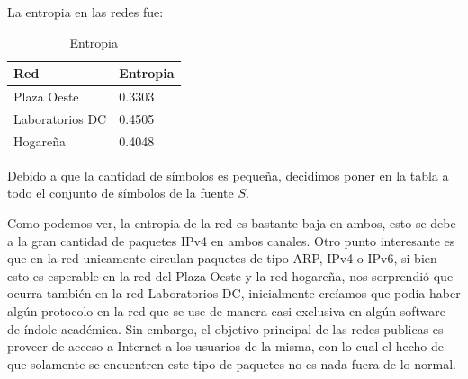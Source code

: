 %
%
%

\pagebreak

La entropia en las redes fue:

\begin{table}[H]
\centering
\caption{Entropia}
\label{my-label}
\begin{tabular}{ll}
\hline
Red         & Entropia \\ \hline
Plaza Oeste & 0.3303   \\
Laboratorios DC    & 0.4505   \\ 
Hogareña & 0.4048   \\  \hline
\end{tabular}
\end{table}

Debido a que la cantidad de símbolos es pequeña, decidimos poner en la tabla a todo el conjunto de símbolos de la fuente $S$.

Como podemos ver, la entropia de la red es bastante baja en ambos, esto se debe a la gran cantidad de paquetes IPv4 en ambos canales. Otro punto interesante es que en la red unicamente circulan paquetes de tipo ARP, IPv4 o IPv6, si bien esto es esperable en la red del Plaza Oeste y la red hogareña, nos sorprendió que ocurra también en la red Laboratorios DC, inicialmente creíamos que podía haber algún protocolo en la red que se use de manera casi exclusiva en algún software de índole académica. Sin embargo, el objetivo principal de las redes publicas es proveer de acceso a Internet a los usuarios de la misma, con lo cual el hecho de que solamente se encuentren este tipo de paquetes no es nada fuera de lo normal.

